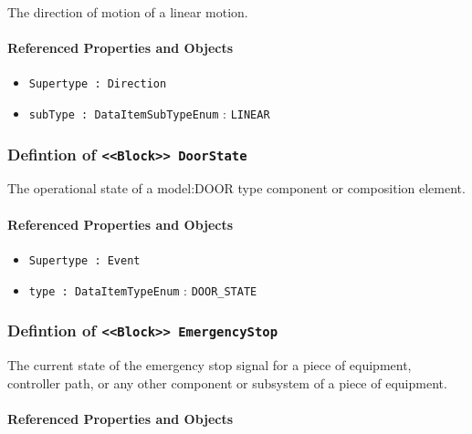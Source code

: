 The direction of motion of a linear motion.

\FloatBarrier
\paragraph{Referenced Properties and Objects}

\begin{itemize}
\item \texttt{Supertype : Direction}

\item \texttt{subType : DataItemSubTypeEnum} : \texttt{LINEAR}

\end{itemize}
\FloatBarrier
\subsubsection{Defintion of \texttt{<<Block>> DoorState}}
  \label{type:DoorState}

\FloatBarrier

The operational state of a {model:DOOR} type component or composition element.

\FloatBarrier
\paragraph{Referenced Properties and Objects}

\begin{itemize}
\item \texttt{Supertype : Event}

\item \texttt{type : DataItemTypeEnum} : \texttt{DOOR_STATE}

\end{itemize}
\FloatBarrier
\subsubsection{Defintion of \texttt{<<Block>> EmergencyStop}}
  \label{type:EmergencyStop}

\FloatBarrier

The current state of the emergency stop signal for a piece of equipment, controller path, or any other component or subsystem of a piece of equipment.

\FloatBarrier
\paragraph{Referenced Properties and Objects}

